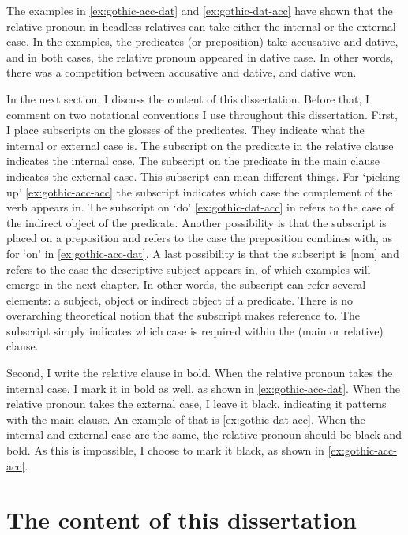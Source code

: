The examples in \ref{ex:gothic-acc-dat} and \ref{ex:gothic-dat-acc} have shown that the relative pronoun in headless relatives can take either the internal or the external case. In the examples, the predicates (or preposition) take accusative and dative, and in both cases, the relative pronoun appeared in dative case. In other words, there was a competition between accusative and dative, and dative won.

In the next section, I discuss the content of this dissertation. Before that, I comment on two notational conventions I use throughout this dissertation. First, I place subscripts on the glosses of the predicates. They indicate what the internal or external case is. The subscript on the predicate in the relative clause indicates the internal case. The subscript on the predicate in the main clause indicates the external case. This subscript can mean different things.
For  `picking up' \ref{ex:gothic-acc-acc} the subscript indicates which case the complement of the verb appears in. The subscript on  `do' \ref{ex:gothic-dat-acc} in refers to the case of the indirect object of the predicate. Another possibility is that the subscript is placed on a preposition and refers to the case the preposition combines with, as for  `on' in \ref{ex:gothic-acc-dat}. A last possibility is that the subscript is [\ac{nom}] and refers to the case the descriptive subject appears in, of which examples will emerge in the next chapter.
In other words, the subscript can refer several elements: a subject, object or indirect object of a predicate. There is no overarching theoretical notion that the subscript makes reference to. The subscript simply indicates which case is required within the (main or relative) clause.

Second, I write the relative clause in bold. When the relative pronoun takes the internal case, I mark it in bold as well, as shown in \ref{ex:gothic-acc-dat}. When the relative pronoun takes the external case, I leave it black, indicating it patterns with the main clause. An example of that is \ref{ex:gothic-dat-acc}. When the internal and external case are the same, the relative pronoun should be black and bold. As this is impossible, I choose to mark it black, as shown in \ref{ex:gothic-acc-acc}.


\section{The content of this dissertation}

